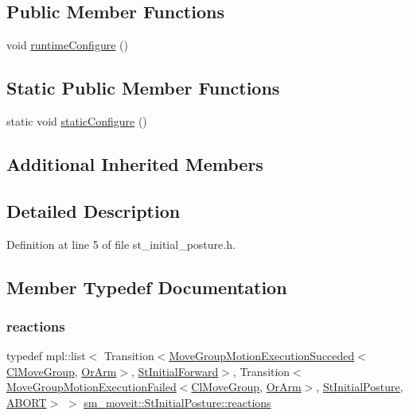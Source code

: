 \subsection*{Public Member Functions}
\begin{DoxyCompactItemize}
\item 
void \hyperlink{structsm__moveit_1_1StInitialPosture_af6985ad418eb655f35bd182973d7234a}{runtime\+Configure} ()
\end{DoxyCompactItemize}
\subsection*{Static Public Member Functions}
\begin{DoxyCompactItemize}
\item 
static void \hyperlink{structsm__moveit_1_1StInitialPosture_a54a2a80bf9a9b5d6838d727bc6ebff3f}{static\+Configure} ()
\end{DoxyCompactItemize}
\subsection*{Additional Inherited Members}


\subsection{Detailed Description}


Definition at line 5 of file st\+\_\+initial\+\_\+posture.\+h.



\subsection{Member Typedef Documentation}
\mbox{\label{structsm__moveit_1_1StInitialPosture_ab6ac709f3c2758548901bc425791149c}} 
\subsubsection{\texorpdfstring{reactions}{reactions}}
{\footnotesize\ttfamily typedef mpl\+::list$<$ Transition$<$\hyperlink{structmoveit__z__client_1_1MoveGroupMotionExecutionSucceded}{Move\+Group\+Motion\+Execution\+Succeded}$<$\hyperlink{classmoveit__z__client_1_1ClMoveGroup}{Cl\+Move\+Group}, \hyperlink{classsm__moveit_1_1OrArm}{Or\+Arm}$>$, \hyperlink{structsm__moveit_1_1StInitialForward}{St\+Initial\+Forward}$>$, Transition$<$\hyperlink{structmoveit__z__client_1_1MoveGroupMotionExecutionFailed}{Move\+Group\+Motion\+Execution\+Failed}$<$\hyperlink{classmoveit__z__client_1_1ClMoveGroup}{Cl\+Move\+Group}, \hyperlink{classsm__moveit_1_1OrArm}{Or\+Arm}$>$, \hyperlink{structsm__moveit_1_1StInitialPosture}{St\+Initial\+Posture}, \hyperlink{classABORT}{A\+B\+O\+RT}$>$ $>$ \hyperlink{structsm__moveit_1_1StInitialPosture_ab6ac709f3c2758548901bc425791149c}{sm\+\_\+moveit\+::\+St\+Initial\+Posture\+::reactions}}



